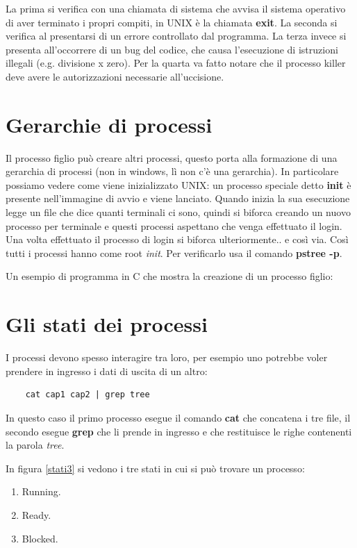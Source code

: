 La prima si verifica con una chiamata di sistema che avvisa il sistema operativo di aver terminato i propri compiti, in UNIX è la chiamata \textbf{exit}. 
La seconda si verifica al presentarsi di un errore controllato dal programma.
La terza invece si presenta all'occorrere di un bug del codice, che causa l'esecuzione di istruzioni illegali (e.g. divisione x zero).
Per la quarta va fatto notare che il processo killer deve avere le autorizzazioni necessarie all'uccisione.

\section{Gerarchie di processi}

Il processo figlio può creare altri processi, questo porta alla formazione di una gerarchia di processi (non in windows, lì non c'è una gerarchia).
In particolare possiamo vedere come viene inizializzato UNIX: un processo speciale detto \textbf{init} è presente nell'immagine di avvio e viene lanciato. Quando inizia la sua esecuzione legge un file che dice quanti terminali ci sono, quindi si biforca creando un nuovo processo per terminale e questi processi aspettano che venga effettuato il login. Una volta effettuato il processo di login si biforca ulteriormente.. e così via. Così tutti i processi hanno come root \textit{init}.
Per verificarlo usa il comando \textbf{pstree -p}.

Un esempio di programma in C che mostra la creazione di un processo figlio:


\section{Gli stati dei processi}

I processi devono spesso interagire tra loro, per esempio uno potrebbe voler prendere in ingresso i dati di uscita di un altro:
\begin{verbatim}
    cat cap1 cap2 | grep tree
\end{verbatim}

In questo caso il primo processo esegue il comando \textbf{cat} che concatena i tre file, il secondo esegue \textbf{grep} che li prende in ingresso e che restituisce le righe contenenti la parola \textit{tree}.

In figura \ref{stati3} si vedono i tre stati in cui si può trovare un processo:
\begin{enumerate}
    \item Running.
    \item Ready.
    \item Blocked.
\end{enumerate}

